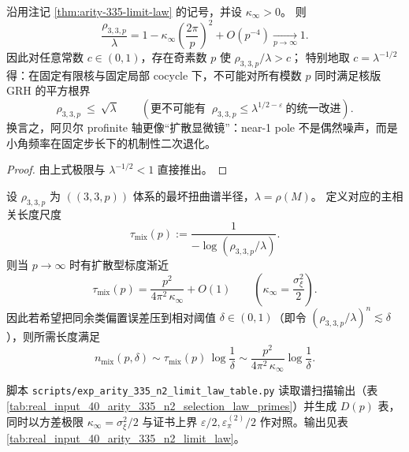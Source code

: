 \begin{corollary}\label{cor:arity-335-abelian-uniform-gap-nogo}
沿用注记 \ref{thm:arity-335-limit-law} 的记号，并设 \(\kappa_\infty>0\)。
则
\[
\frac{\rho_{3,3,p}}{\lambda}
=
1-\kappa_\infty\left(\frac{2\pi}{p}\right)^2+O(p^{-4})
\xrightarrow[p\to\infty]{}1.
\]
因此对任意常数 \(c\in(0,1)\)，存在奇素数 \(p\) 使 \(\rho_{3,3,p}/\lambda>c\)；
特别地取 \(c=\lambda^{-1/2}\) 得：在固定有限核与固定局部 cocycle 下，不可能对所有模数 \(p\) 同时满足核版 GRH 的平方根界
\[
\rho_{3,3,p}\ \le\ \sqrt{\lambda}
\qquad(\text{更不可能有 }\ \rho_{3,3,p}\le \lambda^{1/2-\varepsilon}\ \text{的统一改进}).
\]
换言之，阿贝尔 profinite 轴更像“扩散显微镜”：near-1 pole 不是偶然噪声，而是小角频率在固定步长下的机制性二次退化。
\end{corollary}
\begin{proof}
由上式极限与 \(\lambda^{-1/2}<1\) 直接推出。
\end{proof}

\begin{remark}\label{cor:arity-335-diffusive-mixing}
设 $\rho_{3,3,p}$ 为 $((3,3,p))$ 体系的最坏扭曲谱半径，$\lambda=\rho(M)$。
定义对应的主相关长度尺度
\[
\tau_{\mathrm{mix}}(p):=\frac{1}{-\log(\rho_{3,3,p}/\lambda)}.
\]
则当 $p\to\infty$ 时有扩散型标度渐近
\[
\tau_{\mathrm{mix}}(p)=\frac{p^2}{4\pi^2\,\kappa_\infty}+O(1)
\qquad\left(\kappa_\infty=\frac{\sigma_\xi^2}{2}\right).
\]
因此若希望把同余类偏置误差压到相对阈值 $\delta\in(0,1)$（即令 $(\rho_{3,3,p}/\lambda)^n\lesssim \delta$），则所需长度满足
\[
n_{\mathrm{mix}}(p,\delta)
\sim
\tau_{\mathrm{mix}}(p)\,\log\frac{1}{\delta}
\sim
\frac{p^2}{4\pi^2\,\kappa_\infty}\log\frac{1}{\delta}.
\]
\end{remark}

\begin{remark}\label{rem:arity-335-limit-law-table}
脚本 \texttt{scripts/exp\_arity\_335\_n2\_limit\_law\_table.py} 读取谱扫描输出（表 \ref{tab:real_input_40_arity_335_n2_selection_law_primes}）并生成 \(D(p)\) 表，同时以方差极限 \(\kappa_\infty=\sigma_\xi^2/2\) 与证书上界 \(\varepsilon/2,\varepsilon_\pi^{(2)}/2\) 作对照。输出见表 \ref{tab:real_input_40_arity_335_n2_limit_law}。
\end{remark}



